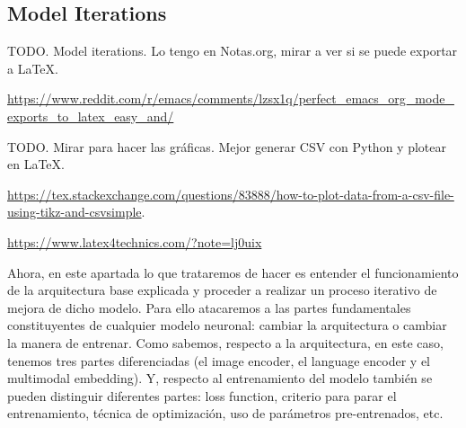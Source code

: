 \subsection{Model Iterations}\label{sec:model-iterations}

TODO. Model iterations. Lo tengo en Notas.org, mirar a ver si se puede exportar
a LaTeX.

\url{https://www.reddit.com/r/emacs/comments/lzsx1q/perfect_emacs_org_mode_exports_to_latex_easy_and/}

TODO. Mirar para hacer las gráficas. Mejor generar CSV con Python y plotear en
LaTeX.

\url{https://tex.stackexchange.com/questions/83888/how-to-plot-data-from-a-csv-file-using-tikz-and-csvsimple}.

\url{https://www.latex4technics.com/?note=lj0uix}


\begin{comment}
  1. He estado trabajando con el modelo de RefVOS, pero no he conseguido
  obtener ninguna mejora significativa. Hasta ahora lo que he probado ha sido:

  - Cambiar la manera en la que se unen las neuronas que provienen de la imagen
  y las que provienen del texto (en el modelo se usa multiplicación). He
  probado a entrenar con suma, resta, concatenación y proyectando usando una
  aplicación lineal (multiplicándolas por una matriz y luego combinándolas).

  - Probar diferentes funciones de error: "weighted cross entropy", "balanced
  cross entropy", "focal loss". Quiero probar también con otras como: "dice
  loss", "tversky index", "IoU loss"...  Las variaciones que he probado
  partiendo de parámetros pre-entrenados apenas varían el modelo (<1\mejora),
  posiblemente porque ya esté el modelo en cierto mínimo local de la función de
  error (al final son todas similares) y los gradientes son prácticamente
  nulos.

  Y probando variaciones con parámetros no-entrenados no consigo llegar a la
  precisión de RefVOS (entreno con train/validation/test y guardo los
  parámetros de la época con mejores resultados en validación).

  Por otro lado, he tratado de crear algún modelo desde 0, sin basarme en
  RefVOS, pero he obtenido resultados nefastos (cercanos a la aleatoriedad).
\end{comment}


Ahora, en este apartada lo que trataremos de hacer es entender el
funcionamiento de la arquitectura base explicada y proceder a realizar un
proceso iterativo de mejora de dicho modelo. Para ello atacaremos a las partes
fundamentales constituyentes de cualquier modelo neuronal: cambiar la
arquitectura o cambiar la manera de entrenar. Como sabemos, respecto a la
arquitectura, en este caso, tenemos tres partes diferenciadas (el image
encoder, el language encoder y el multimodal embedding). Y, respecto al
entrenamiento del modelo también se pueden distinguir diferentes partes: loss
function, criterio para parar el entrenamiento, técnica de optimización, uso de
parámetros pre-entrenados, etc.

